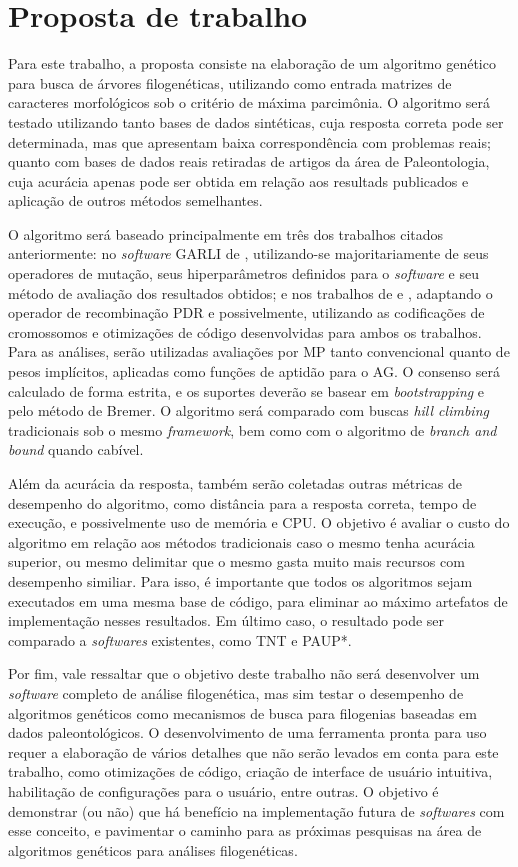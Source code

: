 \documentclass[12pt]{article}
\begin{document}
\section{Proposta de trabalho}

Para este trabalho, a proposta consiste na elaboração de um algoritmo genético para busca de árvores filogenéticas, utilizando como entrada matrizes de caracteres morfológicos sob o critério de máxima parcimônia. O algoritmo será testado utilizando tanto bases de dados sintéticas, cuja resposta correta pode ser determinada, mas que apresentam baixa correspondência com problemas reais; quanto com bases de dados reais retiradas de artigos da área de Paleontologia, cuja acurácia apenas pode ser obtida em relação aos resultads publicados e aplicação de outros métodos semelhantes.

O algoritmo será baseado principalmente em três dos trabalhos citados anteriormente: no \emph{software} GARLI de \cite{garli}, utilizando-se majoritariamente de seus operadores de mutação, seus hiperparâmetros definidos para o \emph{software} e seu método de avaliação dos resultados obtidos; e nos trabalhos de \cite{cotta2002inferring} e \cite{parsigal}, adaptando o operador de recombinação PDR e possivelmente, utilizando as codificações de cromossomos e otimizações de código desenvolvidas para ambos os trabalhos. Para as análises, serão utilizadas avaliações por MP tanto convencional quanto de pesos implícitos, aplicadas como funções de aptidão para o AG. O consenso será calculado de forma estrita, e os suportes deverão se basear em \emph{bootstrapping} e pelo método de Bremer. O algoritmo será comparado com buscas \emph{hill climbing} tradicionais sob o mesmo \emph{framework}, bem como com o algoritmo de \emph{branch and bound} quando cabível.

Além da acurácia da resposta, também serão coletadas outras métricas de desempenho do algoritmo, como distância para a resposta correta, tempo de execução, e possivelmente uso de memória e CPU. O objetivo é avaliar o custo do algoritmo em relação aos métodos tradicionais caso o mesmo tenha acurácia superior, ou mesmo delimitar que o mesmo gasta muito mais recursos com desempenho similiar. Para isso, é importante que todos os algoritmos sejam executados em uma mesma base de código, para eliminar ao máximo artefatos de implementação nesses resultados. Em último caso, o resultado pode ser comparado a \emph{softwares} existentes, como TNT e PAUP*.

Por fim, vale ressaltar que o objetivo deste trabalho não será desenvolver um \emph{software} completo de análise filogenética, mas sim testar o desempenho de algoritmos genéticos como mecanismos de busca para filogenias baseadas em dados paleontológicos. O desenvolvimento de uma ferramenta pronta para uso requer a elaboração de vários detalhes que não serão levados em conta para este trabalho, como otimizações de código, criação de interface de usuário intuitiva, habilitação de configurações para o usuário, entre outras. O objetivo é demonstrar (ou não) que há benefício na implementação futura de \emph{softwares} com esse conceito, e pavimentar o caminho para as próximas pesquisas na área de algoritmos genéticos para análises filogenéticas.
\end{document}
